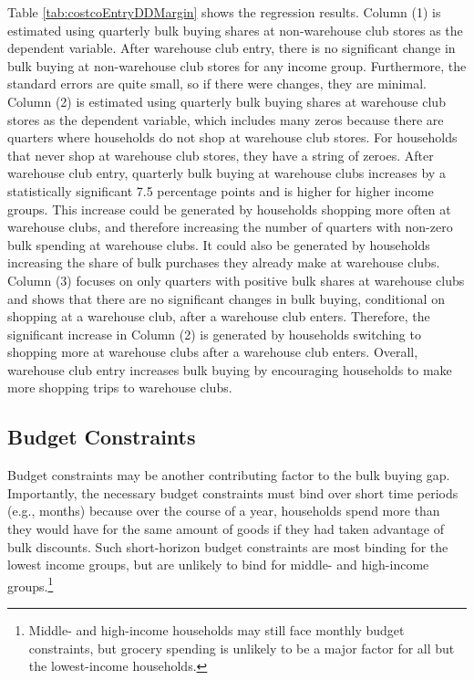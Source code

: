 \documentclass[AER]{AEA_mal}
\begin{document}


Table \ref{tab:costcoEntryDDMargin} shows the regression results. Column (1) is estimated using quarterly bulk buying shares at non-warehouse club stores as the dependent variable. After warehouse club entry, there is no significant change in bulk buying at non-warehouse club stores for any income group. Furthermore, the standard errors are quite small, so if there were changes, they are minimal. Column (2) is estimated using quarterly bulk buying shares at warehouse club stores as the dependent variable, which includes many zeros because there are quarters where households do not shop at warehouse club stores. For households that never shop at warehouse club stores, they have a string of zeroes. After warehouse club entry, quarterly bulk buying at warehouse clubs increases by a statistically significant 7.5 percentage points and is higher for higher income groups. This increase could be generated by households shopping more often at warehouse clubs, and therefore increasing the number of quarters with non-zero bulk spending at warehouse clubs. It could also be generated by households increasing the share of bulk purchases they already make at warehouse clubs. Column (3) focuses on only quarters with positive bulk shares at warehouse clubs and shows that there are no significant changes in bulk buying, conditional on shopping at a warehouse club, after a warehouse club enters. Therefore, the significant increase in Column (2) is generated by households switching to shopping more at warehouse clubs after a warehouse club enters. Overall, warehouse club entry increases bulk buying by encouraging households to make more shopping trips to warehouse clubs.


\subsection{Budget Constraints}
Budget constraints may be another contributing factor to the bulk buying gap. Importantly, the necessary budget constraints must bind over short time periods (e.g., months) because over the course of a year, households spend more than they would have for the same amount of goods if they had taken advantage of bulk discounts. Such short-horizon budget constraints are most binding for the lowest income groups, but are unlikely to bind for middle- and high-income groups.\footnote{Middle- and high-income households may still face monthly budget constraints, but grocery spending is unlikely to be a major factor for all but the lowest-income households.}
\end{document}
